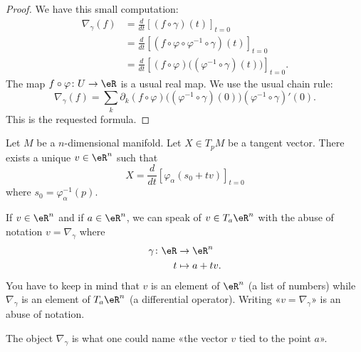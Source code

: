 \begin{proof}
	We have this small computation:
	\begin{subequations}
		\begin{align}
			\nabla_{\gamma}(f) & =\frac{d}{dt} \left[ (f\circ\gamma)(t)  \right]_{t=0}                                        \\
			                   & =\frac{d}{dt} \left[ (f\circ\varphi\circ\varphi^{-1}\circ\gamma)(t)  \right]_{t=0}           \\
			                   & =\frac{d}{dt} \left[ (f\circ\varphi)\Big( (\varphi^{-1}\circ\gamma)(t) \Big)  \right]_{t=0}.
		\end{align}
	\end{subequations}
	The map \(f\circ\varphi \colon U\to \eR  \) is a usual real map. We use the usual chain rule:
	\begin{equation}
		\nabla_{\gamma}(f)=\sum_k\partial_k(f\circ\varphi)\Big( (\varphi^{-1}\circ\gamma)(0) \Big)(\varphi^{-1}\circ\gamma)'(0).
	\end{equation}
	This is the requested formula.
\end{proof}

\begin{proposition}		\label{PROPooLHMSooMMXrSS}
	Let \( M\) be a \( n\)-dimensional manifold. Let \( X\in T_pM\) be a tangent vector. There exists a unique \( v\in \eR^n\) such that
	\begin{equation}
		X=\frac{d}{dt} \left[ \varphi_{\alpha}(s_0+tv)  \right]_{t=0}
	\end{equation}
	where \( s_0=\varphi_{\alpha}^{-1}(p)\).
\end{proposition}

\begin{normaltext}      \label{NORMooXAJGooDNyxjv}
	If \( v\in \eR^n\) and if \( a\in \eR^n\), we can speak of \( v\in T_a\eR^n\) with the abuse of notation \( v=\nabla_{\gamma}\) where
	\begin{equation}
		\begin{aligned}
			\gamma\colon \eR & \to \eR^n     \\
			t                & \mapsto a+tv.
		\end{aligned}
	\end{equation}
	You have to keep in mind that \( v\) is an element of \( \eR^n\) (a list of numbers) while \( \nabla_{\gamma}\) is an element of \( T_a\eR^n\) (a differential operator). Writing «\( v=\nabla_{\gamma}\)» is an abuse of notation.

	The object \( \nabla_{\gamma}\) is what one could name «the vector \( v\) tied to the point \( a\)».
\end{normaltext}

